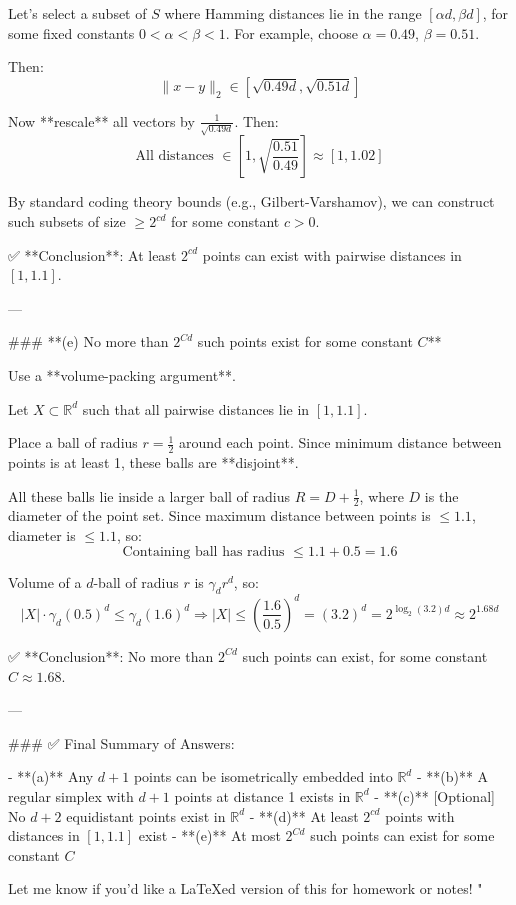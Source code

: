 \begin{enumerate}
\begin{shaded}
Let's select a subset of \( S \) where Hamming distances lie in the range \( [\alpha d, \beta d] \), for some fixed constants \( 0 < \alpha < \beta < 1 \). For example, choose \( \alpha = 0.49 \), \( \beta = 0.51 \).

Then:
\[
\|x - y\|_2 \in [\sqrt{0.49d}, \sqrt{0.51d}]
\]

Now **rescale** all vectors by \( \frac{1}{\sqrt{0.49d}} \). Then:
\[
\text{All distances } \in \left[1, \sqrt{\frac{0.51}{0.49}} \right] \approx [1, 1.02]
\]

By standard coding theory bounds (e.g., Gilbert-Varshamov), we can construct such subsets of size \( \geq 2^{cd} \) for some constant \( c > 0 \).

✅ **Conclusion**: At least \( 2^{cd} \) points can exist with pairwise distances in \( [1, 1.1] \).

---

### **(e) No more than \( 2^{Cd} \) such points exist for some constant \( C \)**

Use a **volume-packing argument**.

Let \( X \subset \mathbb{R}^d \) such that all pairwise distances lie in \( [1, 1.1] \).

Place a ball of radius \( r = \frac{1}{2} \) around each point. Since minimum distance between points is at least 1, these balls are **disjoint**.

All these balls lie inside a larger ball of radius \( R = D + \frac{1}{2} \), where \( D \) is the diameter of the point set. Since maximum distance between points is \( \leq 1.1 \), diameter is \( \leq 1.1 \), so:
\[
\text{Containing ball has radius } \leq 1.1 + 0.5 = 1.6
\]

Volume of a \( d \)-ball of radius \( r \) is \( \gamma_d r^d \), so:
\[
|X| \cdot \gamma_d (0.5)^d \leq \gamma_d (1.6)^d
\Rightarrow |X| \leq \left( \frac{1.6}{0.5} \right)^d = (3.2)^d = 2^{\log_2(3.2) d} \approx 2^{1.68d}
\]

✅ **Conclusion**: No more than \( 2^{Cd} \) such points can exist, for some constant \( C \approx 1.68 \).

---

### ✅ Final Summary of Answers:

- **(a)** Any \( d+1 \) points can be isometrically embedded into \( \mathbb{R}^d \)
- **(b)** A regular simplex with \( d+1 \) points at distance 1 exists in \( \mathbb{R}^d \)
- **(c)** [Optional] No \( d+2 \) equidistant points exist in \( \mathbb{R}^d \)
- **(d)** At least \( 2^{cd} \) points with distances in \( [1, 1.1] \) exist
- **(e)** At most \( 2^{Cd} \) such points can exist for some constant \( C \)

Let me know if you'd like a LaTeXed version of this for homework or notes!
"

\fi
\end{shaded}
\fi


\end{enumerate}


